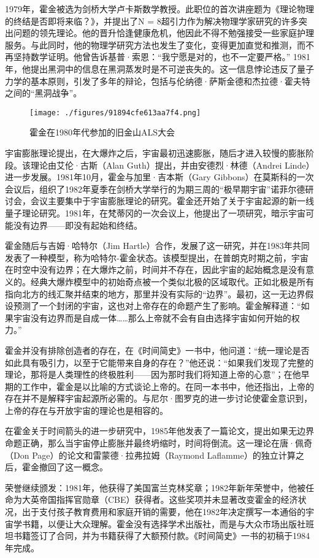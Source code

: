 1979年，霍金被选为剑桥大学卢卡斯数学教授。此职位的首次讲座题为《理论物理的终结是否即将来临？》，并提出了N = 8超引力作为解决物理学家研究的许多突出问题的领先理论。他的晋升恰逢健康危机，他因此不得不勉强接受一些家庭护理服务。与此同时，他的物理学研究方法也发生了变化，变得更加直觉和推测，而不再坚持数学证明。他曾告诉基普·索恩：“我宁愿是对的，也不一定要严格。”
1981年，他提出黑洞中的信息在黑洞蒸发时是不可逆丧失的。这一信息悖论违反了量子力学的基本原则，引发了多年的辩论，包括与伦纳德·萨斯金德和杰拉德·霍夫特之间的“黑洞战争”。
\begin{figure}[ht]
\centering
\texttt{[image: ./figures/91894cfe613aa7f4.png]}
\caption{霍金在1980年代参加的旧金山ALS大会} \label{fig_HJ_2}
\end{figure}
宇宙膨胀理论提出，在大爆炸之后，宇宙最初迅速膨胀，随后才进入较慢的膨胀阶段。该理论由艾伦·古斯（Alan Guth）提出，并由安德烈·林德（Andrei Linde）进一步发展。1981年10月，霍金与加里·吉本斯（Gary Gibbons）在莫斯科的一次会议后，组织了1982年夏季在剑桥大学举行的为期三周的“极早期宇宙”诺菲尔德研讨会，会议主要集中于宇宙膨胀理论的研究。霍金还开始了关于宇宙起源的新一线量子理论研究。1981年，在梵蒂冈的一次会议上，他提出了一项研究，暗示宇宙可能没有边界——即没有起始和终结。

霍金随后与吉姆·哈特尔（Jim Hartle）合作，发展了这一研究，并在1983年共同发表了一种模型，称为哈特尔-霍金状态。该模型提出，在普朗克时期之前，宇宙在时空中没有边界；在大爆炸之前，时间并不存在，因此宇宙的起始概念是没有意义的。经典大爆炸模型中的初始奇点被一个类似北极的区域取代。正如北极是所有指向北方的线汇聚并结束的地方，那里并没有实际的“边界”。最初，这一无边界假设预测了一个封闭的宇宙，这也对上帝存在的命题产生了影响。霍金解释道：“如果宇宙没有边界而是自成一体……那么上帝就不会有自由选择宇宙如何开始的权力。”

霍金并没有排除创造者的存在，在《时间简史》一书中，他问道：“统一理论是否如此具有吸引力，以至于它能带来自身的存在？”他还说：“如果我们发现了完整的理论，那将是人类理性的终极胜利——因为那时我们将知道上帝的心意”；在他早期的工作中，霍金是以比喻的方式谈论上帝的。在同一本书中，他还指出，上帝的存在并不是解释宇宙起源所必需的。与尼尔·图罗克的进一步讨论使霍金意识到，上帝的存在与开放宇宙的理论也是相容的。

在霍金关于时间箭头的进一步研究中，1985年他发表了一篇论文，提出如果无边界命题正确，那么当宇宙停止膨胀并最终坍缩时，时间将倒流。这一理论在唐·佩奇（Don Page）的论文和雷蒙德·拉弗拉姆（Raymond Laflamme）的独立计算之后，霍金撤回了这一概念。

荣誉继续颁发：1981年，他获得了美国富兰克林奖章；1982年新年荣誉中，他被任命为大英帝国指挥官勋章（CBE）获得者。这些奖项并未显著改变霍金的经济状况，出于支付孩子教育费用和家庭开销的需要，他在1982年决定撰写一本通俗的宇宙学书籍，以便让大众理解。霍金没有选择学术出版社，而是与大众市场出版社班坦书籍签订了合同，并为书籍获得了大额预付款。《时间简史》一书的初稿于1984年完成。

